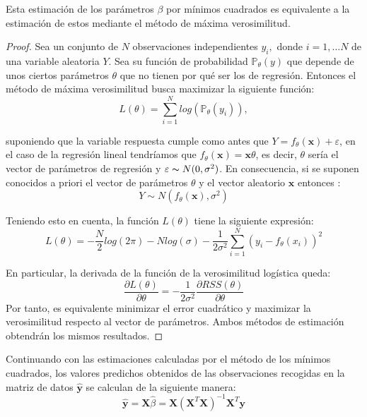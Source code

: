 \begin{propo}
Esta estimación de los parámetros $\beta$ por mínimos cuadrados es equivalente a la estimación de estos mediante el método de máxima verosimilitud.
\begin{proof}
Sea un conjunto de $N$ observaciones independientes $y_i, $ donde $i=1,\ldots N$ de una variable aleatoria $Y$. Sea su  función de probabilidad  $\mathbb{P}_\theta(y)$ que depende de unos ciertos parámetros $\theta$ que no tienen por qué ser los de regresión. Entonces el método de máxima verosimilitud busca maximizar la siguiente función:
\begin{equation}
L(\theta)=\sum_{i=1}^N log( \mathbb{P}_{\theta} (y_i)),
\end{equation}

\noindent suponiendo que la variable respuesta cumple como antes que  $Y=f_\theta (\textbf{x})+\varepsilon$, en el caso de la regresión lineal tendríamos que $f_\theta(\mathbf{x})=\mathbf{x}\theta$, es decir, $\theta$ sería el vector de parámetros de regresión y $\varepsilon \thicksim N(0,\sigma^2)$. En consecuencia, si se suponen conocidos a priori el vector de parámetros $\theta$ y el vector aleatorio $\textbf{x}$ entonces :
\begin{equation}
Y\sim N(f_\theta(\textbf{x}), \sigma^2)
\end{equation}

\noindent Teniendo esto en cuenta, la función $L(\theta)$ tiene la siguiente expresión:
\begin{equation}
L(\theta)=-\dfrac{N}{2}log(2\pi)-N log(\sigma)-\dfrac{1}{2\sigma^2}\sum_{i=1}^N (y_i-f_\theta(x_i))^2
\end{equation}

\noindent En particular, la derivada de la función de la verosimilitud logística queda:
\begin{equation}
\dfrac{\partial L(\theta)}{\partial \theta}=-\dfrac{1}{2\sigma^2}\dfrac{\partial RSS(\theta)}{\partial \theta}
\end{equation}
\noindent Por tanto, es equivalente minimizar el error cuadrático y maximizar la verosimilitud respecto al vector de parámetros. Ambos métodos de estimación obtendrán los mismos resultados. 
\end{proof}
\end{propo}

\noindent Continuando con las estimaciones calculadas por el método de los mínimos cuadrados, los valores predichos obtenidos de las observaciones recogidas en la matriz de datos $\hat{\textbf{y}}$ se calculan de la siguiente manera:
\begin{equation}
\hat{\textbf{y}}=\textbf{X}\hat{\beta}=\textbf{X}(\textbf{X}^T\textbf{X})^{-1}\textbf{X}^T\textbf{y}
\end{equation}

